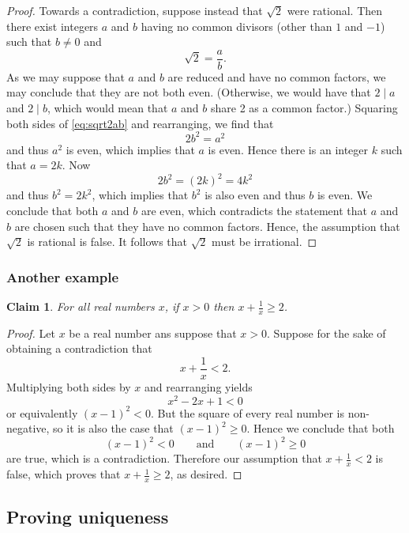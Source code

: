 \documentclass[11pt]{article}
\theoremstyle{plain}
\newtheorem*{claim}{Claim}
\theoremstyle{plain}
\theoremstyle{remark}
\begin{document}
\begin{proof}
 Towards a contradiction, suppose instead that $\sqrt{2}$ were rational. Then there exist integers $a$ and $b$ having no common divisors (other than $1$ and $-1$) such that $b\neq0$ and 
 \begin{equation}
  \sqrt{2} = \frac{a}{b}. \label{eq:sqrt2ab}
 \end{equation}
 As we may suppose that $a$ and $b$ are reduced and have no common factors, we may conclude that they are not both even. (Otherwise, we would have that $2\mid a$ and $2\mid b$, which would mean that $a$ and $b$ share 2 as a common factor.) Squaring both sides of \eqref{eq:sqrt2ab} and rearranging, we find that 
\[
 2b^2 = a^2
\]
and thus $a^2$ is even, which implies that $a$ is even. Hence there is an integer $k$ such that $a=2k$. Now
\[
 2b^2 = (2k)^2 = 4k^2
\]
and thus $b^2=2k^2$, which implies that $b^2$ is also even and thus $b$ is even. We conclude that both $a$ and $b$ are even, which contradicts the statement that $a$ and $b$ are chosen such that they have no common factors. Hence, the assumption that $\sqrt{2}$ is rational is false. It follows that $\sqrt{2}$ must be irrational.
\end{proof}

\subsubsection*{Another example}


\begin{tcolorbox}
\begin{claim}
 For all real numbers $x$, if $x>0$ then $x+\frac{1}{x}\geq2$.
\end{claim}
\end{tcolorbox}
\begin{proof}
 Let $x$ be a real number ans suppose that $x>0$. Suppose for the sake of obtaining a contradiction that 
 \[
  x+\frac{1}{x}<2.
 \]
Multiplying both sides by $x$ and rearranging yields
\[
 x^2 - 2x + 1 < 0
\]
or equivalently $(x-1)^2<0$. But the square of every real number is non-negative, so it is also the case that  $(x-1)^2\geq0$. Hence we conclude that both
\[
 (x-1)^2<0 \qquad\text{and}\qquad(x-1)^2\geq0
\]
are true, which is a contradiction. Therefore our assumption that $x+\frac{1}{x}<2$ is false, which proves that $x+\frac{1}{x}\geq2$, as desired.
\end{proof}


\subsection*{Proving uniqueness}
\end{document}
